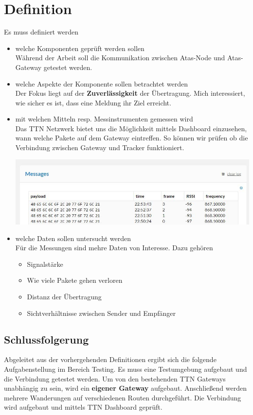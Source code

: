 \documentclass[11pt,english,german]{report}
\theoremstyle{definition}
\begin{document}
\section{Definition}
Es muss definiert werden
\begin{itemize}
	\item welche Komponenten geprüft werden sollen\\[0.3cm]
	Während der Arbeit soll die Kommunikation zwischen Atas-Node und Atas-Gateway getestet werden.
	\item welche Aspekte der Komponente sollen betrachtet werden\\[0.3cm]
	Der Fokus liegt auf der \textbf{Zuverlässigkeit} der Übertragung. Mich interessiert, wie sicher es ist, dass eine Meldung ihr Ziel erreicht. 
	\item mit welchen Mitteln resp. Messinstrumenten gemessen wird\\[0.3cm]
	Das TTN Netzwerk bietet uns die Möglichkeit mittels Dashboard einzusehen, wann welche Pakete auf dem Gateway eintreffen. So können wir prüfen ob die Verbindung zwischen Gateway und Tracker funktioniert.\bigskip
	
	\begin{minipage}{\linewidth}
		\centering
		\includegraphics[width=\linewidth]{img/ttn_messages}
	\end{minipage}
	
	\item welche Daten sollen untersucht werden\\[0.3cm]
	Für die Messungen sind mehre Daten von Interesse. Dazu gehören 
	\begin{itemize}
		\item Signalstärke
		\item Wie viele Pakete gehen verloren
		\item Distanz der Übertragung
		\item Sichtverhältnisse zwischen Sender und Empfänger
	\end{itemize}
\end{itemize}

\subsection{Schlussfolgerung}
Abgeleitet aus der vorhergehenden Definitionen ergibt sich die folgende Aufgabenstellung im Bereich Testing. Es muss eine Testumgebung aufgebaut und die Verbindung getestet werden. Um von den bestehenden TTN Gateways unabhängig zu sein, wird ein \textbf{eigener Gateway} aufgebaut. Anschließend werden mehrere Wanderungen auf verschiedenen Routen durchgeführt. Die Verbindung wird aufgebaut und mittels TTN Dashboard geprüft.
\end{document}
